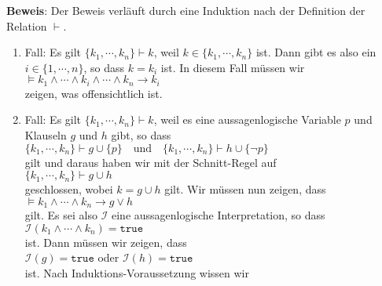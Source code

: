 \noindent
\textbf{Beweis}:  Der Beweis verl\"{a}uft durch eine Induktion nach der Definition der Relation $\vdash$. 
\begin{enumerate}
\item Fall: Es gilt $\{ k_1, \cdots, k_n \} \vdash k$, weil $k \in \{ k_1, \cdots, k_n \}$ ist.  
      Dann gibt es also ein $i \in \{1,\cdots,n\}$, so dass $k = k_i$ ist.  In diesem Fall
      m\"{u}ssen wir
      \\[0.2cm]
      \hspace*{1.3cm}
      $\models k_1 \wedge \cdots \wedge k_i \wedge \cdots \wedge k_n \rightarrow k_i$
      \\[0.2cm]
      zeigen, was offensichtlich ist.
\item Fall: Es gilt $\{ k_1, \cdots, k_n \} \vdash k$, weil es eine aussagenlogische
      Variable $p$ und Klauseln $g$ und $h$ gibt, so dass 
      \\[0.2cm]
      \hspace*{1.3cm}
      $\{ k_1, \cdots, k_n \} \vdash g \cup \{ p \} \quad \mathrm{und} \quad
         \{ k_1, \cdots, k_n \} \vdash h \cup \{ \neg p \}
      $
      \\[0.2cm]
      gilt und daraus haben wir mit der Schnitt-Regel auf
      \\[0.2cm]
      \hspace*{1.3cm}
      $\{ k_1, \cdots, k_n \} \vdash g \cup h$
      \\[0.2cm]
      geschlossen, wobei $k = g \cup h$ gilt.  Wir m\"ussen nun zeigen, dass 
      \\[0.2cm]
      \hspace*{1.3cm}
      $\models k_1 \wedge \cdots \wedge k_n \rightarrow g \vee h$
      \\[0.2cm]
      gilt.  Es sei also $\mathcal{I}$ eine aussagenlogische Interpretation, so dass
      \\[0.2cm]
      \hspace*{1.3cm}
      $\mathcal{I}(k_1 \wedge \cdots \wedge k_n) = \mathtt{true}$  
      \\[0.2cm]
      ist. Dann m\"ussen wir zeigen, dass 
      \\[0.2cm]
      \hspace*{1.3cm}
      $\mathcal{I}(g) = \mathtt{true}$ \quad oder \quad $\mathcal{I}(h) = \mathtt{true}$
      \\[0.2cm]
      ist.  Nach Induktions-Voraussetzung wissen wir
      \\[0.2cm]
      \hspace*{1.3cm}

\end{enumerate}
